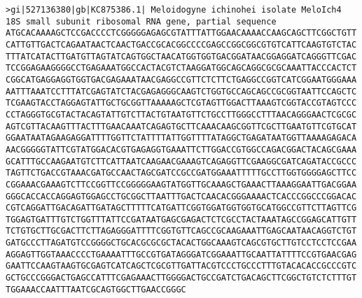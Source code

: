 \documentclass[11pt]{article}
\begin{document}
\begin{Verbatim}[commandchars=\\\{\}]
>gi|527136380|gb|KC875386.1| Meloidogyne ichinohei isolate MeloIch4 18S small subunit ribosomal RNA gene, partial sequence
ATGCACAAAAGCTCCGACCCCTCGGGGGAGAGCGTATTTATTGGAACAAAACCAAGCAGCTTCGGCTGTT
CATTGTTGACTCAGAATAACTCAACTGACCGCACGGCCCCGAGCCGGCGGCGTGTCATTCAAGTGTCTAC
TTTATCATACTTGATGTTAGTATCAGTGGCTAACATGGTGGTGACGGATAACGGAGGATCAGGGTTCGAC
TCCGGAGAAGGGGCCTGAGAAATGGCCACTACGTCTAAGGATGGCAGCAGGCGCGCAAATTACCCACTCT
CGGCATGAGGAGGTGGTGACGAGAAATAACGAGGCCGTTCTCTTCTGAGGCCGGTCATCGGAATGGGAAA
AATTTAAATCCTTTATCGAGTATCTACGAGAGGGCAAGTCTGGTGCCAGCAGCCGCGGTAATTCCAGCTC
TCGAAGTACCTAGGAGTATTGCTGCGGTTAAAAAGCTCGTAGTTGGACTTAAAGTCGGTACCGTAGTCCC
CCTAGGGTGCGTACTACAGTATTGTCTTACTGTAATGTTCTGCCTTGGGCCTTTAACAGGGAACTCGCGC
AGTCGTTACAAGTTTACTTTGAACAAATCAGAGTGCTTCAAACAAGCGGTTCGCTTGAATGTTCGTGCAT
GGAATAATAGAAGAGGATTTTGGTTCTATTTTATTGGTTTTATAGGCTGAGATAATGGTTAAAAGAGACA
AACGGGGGTATTCGTATGGACACGTGAGAGGTGAAATTCTTGGACCGTGGCCAGACGGACTACAGCGAAA
GCATTTGCCAAGAATGTCTTCATTAATCAAGAACGAAAGTCAGAGGTTCGAAGGCGATCAGATACCGCCC
TAGTTCTGACCGTAAACGATGCCAACTAGCGATCCGCCGATGGAAATTTTTGCCTTGGTGGGGAGCTTCC
CGGAAACGAAAGTCTTCCGGTTCCGGGGGAAGTATGGTTGCAAAGCTGAAACTTAAAGGAATTGACGGAA
GGGCACCACCAGGAGTGGAGCCTGCGGCTTAATTTGACTCAACACGGGAAAACTCACCCGGCCCGGACAC
CGTCAGGATTGACAGATTGATAGCTTTTTCATGATTCGGTGGATGGTGGTGCATGGCCGTTCTTAGTTCG
TGGAGTGATTTGTCTGGTTTATTCCGATAATGAGCGAGACTCTCGCCTACTAAATAGCCGGAGCATTGTT
TCTGTGCTTGCGACTTCTTAGAGGGATTTTCGGTGTTCAGCCGCAAGAAATTGAGCAATAACAGGTCTGT
GATGCCCTTAGATGTCCGGGGCTGCACGCGCGCTACACTGGCAAAGTCAGCGTGCTTGTCCTCCTCCGAA
AGGAGTTGGTAAACCCCTGAAAATTTGCCGTGATAGGGATCGGAAATTGCAATTATTTTCCGTGAACGAG
GAATTCCAAGTAAGTGCGAGTCATCAGCTCGCGTTGATTACGTCCCTGCCCTTTGTACACACCGCCCGTC
GCTGCCCGGGACTGAGCCATTTCGAGAAACTTGGGGACTGCCGATCTGACAGCTTCGGCTGTCTCTTTGT
TGGAAACCAATTTAATCGCAGTGGCTTGAACCGGGC


\end{Verbatim}
\end{document}
